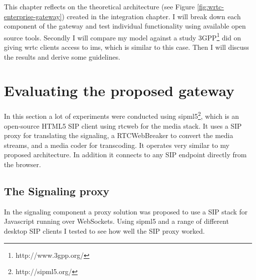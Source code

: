 
This chapter reflects on the theoretical architecture (see Figure \ref{fig:wrtc-enterprise-gateway}) created in the integration chapter. I will break down each component of the gateway and test individual functionality using available open source tools. Secondly I will compare my model against a study 3GPP\footnote{http://www.3gpp.org/} did on giving \gls{wrtc} clients access to \gls{ims}, which is similar to this case. Then I will discuss the results and derive some guidelines.

\section{Evaluating the proposed gateway}
In this section a lot of experiments were conducted using sipml5\footnote{http://sipml5.org/}, which is an open-source HTML5 SIP client using \gls{rtcweb} for the media stack. It uses a SIP proxy for translating the signaling, a RTCWebBreaker to convert the media streams, and a media coder for transcoding. It operates very similar to my proposed architecture. In addition it connects to any SIP endpoint directly from the browser.

\subsection{The Signaling proxy}
In the signaling component a proxy solution was proposed to use a SIP stack for Javascript running over WebSockets. Using sipml5 and a range of different desktop SIP clients I tested to see how well the SIP proxy worked.   

